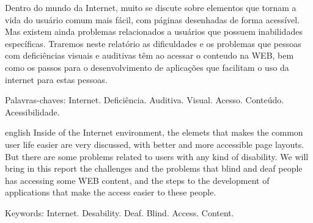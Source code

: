 \documentclass[
	12pt,				%
	oneside,			%
	a4paper,			%
	english,			%
	brazil				%
	]{abntex2ppgsi}
\begin{document}
\frenchspacing 


%
% 
%
\imprimircapa

\imprimirfolhaderosto


\setlength{\absparsep}{18pt} %
\begin{resumo}

Dentro do mundo da Internet, muito se discute sobre elementos que tornam a vida do usuário comum mais fácil, com páginas desenhadas de forma acessível. Mas existem ainda problemas relacionados a usuários que possuem inabilidades específicas. Traremos neste relatório as dificuldades e os problemas que pessoas com deficiências visuais e auditivas têm ao acessar o conteudo na WEB, bem como os passos para o desenvolvimento de aplicações que facilitam o uso da internet para estas pessoas.

Palavras-chaves: Internet. Deficiência. Auditiva. Visual. Acesso. Conteúdo. Acessibilidade.
\end{resumo}

% 
% 
\begin{resumo}[Abstract]
\begin{otherlanguage*}{english}
Inside of the Internet environment, the elemets that makes the common user life easier are very discussed, with better and more accessible page layouts. But there are some problems related to users with any kind of disability. We will bring in this report the challenges and the problems that blind and deaf people has accessing some WEB content, and the steps to the development of applications that make the access easier to these people.

Keywords: Internet. Desability. Deaf. Blind. Access. Content. 
\end{otherlanguage*}
\end{resumo}
\end{document}
